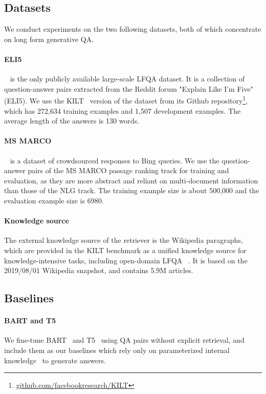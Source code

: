 \documentclass[11pt]{article}
\begin{document}
\subsection{Datasets}
We conduct experiments on the two following datasets, both of which concentrate on long form generative QA.
\vspace{-5pt}
\paragraph{ELI5}~\cite{fan2019eli5} is the only publicly available large-scale LFQA dataset. It is a collection of
question-answer pairs extracted from the Reddit forum "Explain Like
I’m Five"(ELI5). We use the KILT~\cite{petroni2021kilt}  version of the dataset from its Github repository\footnote{\url{github.com/facebookresearch/KILT}}, which
has 272,634 training examples and 1,507 development examples. The average length of the answers is 130 words.
\vspace{-5pt}
\paragraph{MS MARCO}~\cite{nguyen2016ms} is a dataset of crowdsourced responses to Bing
queries. We use the question-answer pairs of the MS MARCO passage ranking track for training and evaluation, as they are more abstract and reliant on multi-document information than those of the NLG track. The training example size is about 500,000 and the evaluation example size is 6980. 

\vspace{-5pt}
\paragraph{Knowledge source} The external knowledge source of the retriever is the Wikipedia paragraphs, which are provided in the KILT benchmark as a unified knowledge source for knowledge-intensive tasks, including open-domain LFQA ~\cite{petroni2021kilt}. It is based on the 2019/08/01 Wikipedia snapshot, and contains 5.9M articles. 


\vspace{-5pt}
\subsection{Baselines}
\label{sec:baselines}
\paragraph{BART and T5} We fine-tune BART~\cite{lewis2020bart} and T5~\cite{raffel2020exploring} using QA pairs without explicit retrieval, and include them as our baselines which rely only on parameterized internal knowledge~\cite{roberts2020much} to generate answers.
\vspace{-5pt}
\end{document}
